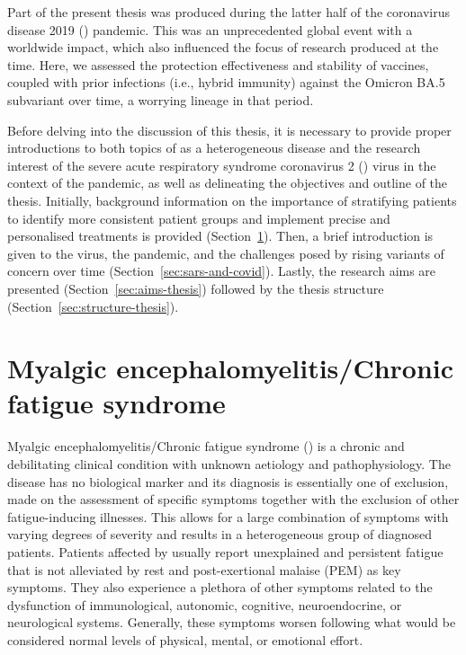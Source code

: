 Part of the present thesis was produced during the latter half of the coronavirus disease 2019 (\covid) pandemic. This was an unprecedented global event with a worldwide impact, which also influenced the focus of research produced at the time. Here, we assessed the protection effectiveness and stability of vaccines, coupled with prior infections (i.e., hybrid immunity) against the Omicron BA.5 subvariant over time, a worrying lineage in that period.

Before delving into the discussion of this thesis, it is necessary to provide proper introductions to both topics of \cfs as a heterogeneous disease and the research interest of the severe acute respiratory syndrome coronavirus 2 (\sars) virus in the context of the pandemic, as well as delineating the objectives and outline of the thesis. Initially, background information on the importance of stratifying \cfs patients to identify more consistent patient groups and implement precise and personalised treatments is provided (Section~\ref{sec:background-mecfs}). Then, a brief introduction is given to the \sars virus, the \covid pandemic, and the challenges posed by rising variants of concern over time (Section~\ref{sec:sars-and-covid}). Lastly, the research aims are presented (Section~\ref{sec:aims-thesis}) followed by the thesis structure (Section~\ref{sec:structure-thesis}).

\section{Myalgic encephalomyelitis/Chronic fatigue syndrome}
\label{sec:background-mecfs}

Myalgic encephalomyelitis/Chronic fatigue syndrome (\cfs) 
is a chronic and debilitating clinical condition with unknown aetiology and pathophysiology.
The disease has no biological marker and its diagnosis is essentially one of exclusion, made on the assessment of specific symptoms together with the exclusion of other fatigue-inducing illnesses.
This allows for a large combination of symptoms with varying degrees of severity and results in a heterogeneous group of diagnosed patients.
Patients affected by \cfs usually report unexplained and persistent fatigue that is not alleviated by rest and post-exertional malaise (PEM) as key symptoms.
They also experience a plethora of other symptoms related to the dysfunction of immunological, autonomic, cognitive, neuroendocrine, or neurological systems.
Generally, these symptoms worsen following what would be considered normal levels of physical, mental, or emotional effort.

